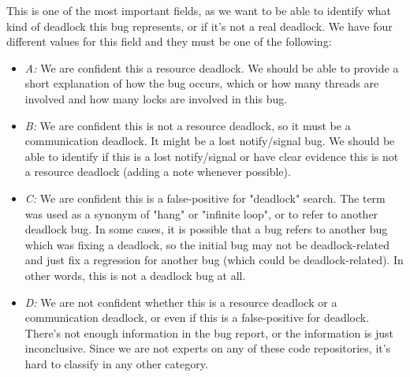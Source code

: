 This is one of the most important fields, as we want to be able to identify what kind of deadlock this bug represents, or if it's not a real deadlock. We have four different values for this field and they must be one of the following:

\begin{itemize}
\item \emph{A:} We are confident this a resource deadlock. We should be able to provide a short explanation of how the bug occurs, which or how many threads are involved and how many locks are involved in this bug.

\item \emph{B:} We are confident this is not a resource deadlock, so it must be a communication deadlock. It might be a lost notify/signal bug. We should be able to identify if this is a lost notify/signal or have clear evidence this is not a resource deadlock (adding a note whenever possible).

\item \emph{C:} We are confident this is a false-positive for "deadlock" search. The term was used as a synonym of "hang" or "infinite loop", or to refer to another deadlock bug. In some cases, it is possible that a bug refers to another bug which was fixing a deadlock, so the initial bug may not be deadlock-related and just fix a regression for another bug (which could be deadlock-related). In other words, this is not a deadlock bug at all.

\item \emph{D:} We are not confident whether this is a resource deadlock or a communication deadlock, or even if this is a false-positive for deadlock. There's not enough information in the bug report, or the information is just inconclusive. Since we are not experts on any of these code repositories, it's hard to classify in any other category.
\end{itemize}

